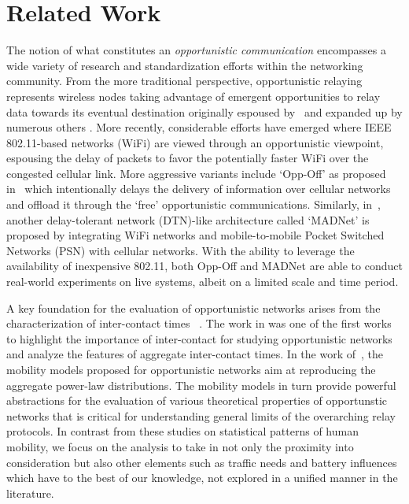 \section{Related Work}\label{sec:related_work}
The notion of what constitutes an \emph{opportunistic communication} encompasses a wide variety of research and standardization efforts within the networking community.  From the more traditional perspective, opportunistic relaying represents wireless nodes taking advantage of emergent opportunities to relay data towards its eventual destination originally espoused by~\cite{laneman2004cooperative} and expanded up by numerous others \cite{bletsas2006simple,lu2009design,bahl2009opportunistic}.  More recently, considerable efforts have emerged where IEEE 802.11-based networks (WiFi) are viewed through an opportunistic viewpoint, espousing the delay of packets to favor the potentially faster WiFi over the congested cellular link.  More aggressive variants include `Opp-Off' as proposed in~\cite{han2011mobile2} which intentionally delays the delivery of information over cellular networks and offload it through the `free' opportunistic communications. Similarly, in~\cite{dimatteo2011cellular}, another delay-tolerant network (DTN)-like architecture called `MADNet' is proposed by integrating WiFi networks and mobile-to-mobile Pocket Switched Networks (PSN) with cellular networks.   With the ability to leverage the availability of inexpensive 802.11, both Opp-Off and MADNet are able to conduct real-world experiments on live systems, albeit on a limited scale and time period.   

A key foundation for the evaluation of opportunistic networks arises from the characterization of inter-contact times 
~\cite{chaintreau2007impact,cai2008toward,lee2009slaw,karagiannis2010power,passarella2011characterising}. The work in \cite{chaintreau2007impact} was one of the first works to highlight the importance of inter-contact for studying opportunistic networks and analyze the features of aggregate inter-contact times. In the work of~\cite{cai2008toward,lee2009slaw}, the mobility models proposed for opportunistic networks aim at reproducing the aggregate power-law distributions.  The mobility models in turn provide powerful abstractions for the evaluation of various theoretical properties of opportunstic networks that is critical for understanding general limits of the overarching relay protocols.  In contrast from these studies on statistical patterns of human mobility, we focus on the analysis to take in not only the proximity into consideration but also other elements such as traffic needs and battery influences which have to the best of our knowledge, not explored in a unified manner in the literature. 


